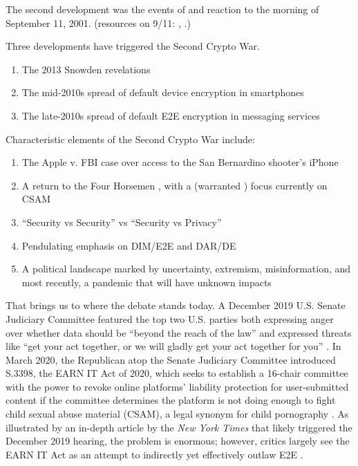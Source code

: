 The second development was the events of and reaction to the morning of September 11, 2001. (resources on 9/11:
\cite{shamsi_2011}, \cite{bloss_escalating_2007}.)

Three developments have triggered the Second Crypto War.
\begin{enumerate}
    \item The 2013 Snowden revelations \cite{thorsen_cryptic_2017} \cite{treguer_us_2018}
    \item The mid-2010s spread of default device encryption in smartphones \cite{treguer_us_2018}
    \item The late-2010s spread of default E2E encryption in messaging services \cite{treguer_us_2018}
\end{enumerate}

Characteristic elements of the Second Crypto War include:
\begin{enumerate}
    \item The Apple v. FBI case over access to the San Bernardino shooter's iPhone \cite{schulze_clipper_2017}
    \item A return to the Four Horsemen \cite{schneier_scaring_2019}, with a (warranted \cite{keller_internet_2019})
            focus currently on CSAM \cite{geller_2019}
    \item ``Security vs Security'' vs ``Security vs Privacy'' \cite{stalla_bourdillon_privacy_2014} \cite{schneier_2019}
    \item Pendulating emphasis on DIM/E2E and DAR/DE \cite{schneier_2019}
    \item A political landscape marked by uncertainty, extremism, misinformation, and most recently, a pandemic that
            will have unknown impacts
\end{enumerate}

That brings us to where the debate stands today. A December 2019 U.S. Senate Judiciary Committee featured the top two
U.S. parties both expressing anger over whether data should be ``beyond the reach of the law'' and expressed threats
like ``get your act together, or we will gladly get your act together for you'' \cite{geller_2019}. In March 2020, the
Republican atop the Senate Judiciary Committee introduced S.3398, the EARN IT Act of 2020, which seeks to establish a
16-chair committee with the power to revoke online platforms' liability protection for user-submitted content if the
committee determines the platform is not doing enough to fight child sexual abuse material (CSAM), a legal synonym for
child pornography \cite{graham_s3398_2020}. As illustrated by an in-depth article by the \textit{New York Times}
\cite{keller_internet_2019} that likely triggered the December 2019 hearing, the problem is enormous; however, critics
largely see the EARN IT Act as an attempt to indirectly yet effectively outlaw E2E \cite{newman_2020}
\cite{pfefferkorn_2020}.

